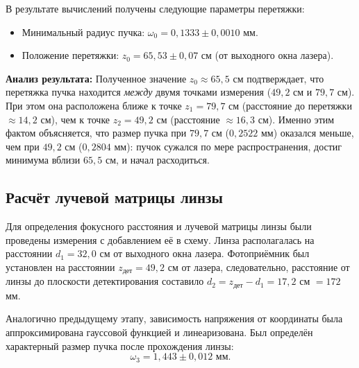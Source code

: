\documentclass[12pt, a4paper]{article}
\begin{document}

В результате вычислений получены следующие параметры перетяжки:
\begin{itemize}
    \item Минимальный радиус пучка: $\omega_0 = 0,1333 \pm 0,0010$ мм.
    \item Положение перетяжки: $z_0 = 65,53 \pm 0,07$ см (от выходного окна лазера).
\end{itemize}

\textbf{Анализ результата:} 
Полученное значение $z_0 \approx 65,5$ см подтверждает, что перетяжка пучка находится \textit{между} двумя точками измерения ($49,2$ см и $79,7$ см). При этом она расположена ближе к точке $z_1 = 79,7$ см (расстояние до перетяжки $\approx 14,2$ см), чем к точке $z_2 = 49,2$ см (расстояние $\approx 16,3$ см). Именно этим фактом объясняется, что размер пучка при $79,7$ см ($0,2522$ мм) оказался меньше, чем при $49,2$ см ($0,2804$ мм): пучок сужался по мере распространения, достиг минимума вблизи $65,5$ см, и начал расходиться.









\subsection*{Расчёт лучевой матрицы линзы}

Для определения фокусного расстояния и лучевой матрицы линзы были проведены измерения с добавлением её в схему. Линза располагалась на расстоянии $d_1 = 32,0$ см от выходного окна лазера. Фотоприёмник был установлен на расстоянии $z_{\text{дет}} = 49,2$ см от лазера, следовательно, расстояние от линзы до плоскости детектирования составило $d_2 = z_{\text{дет}} - d_1 = 17,2$ см $= 172$ мм.

Аналогично предыдущему этапу, зависимость напряжения от координаты была аппроксимирована гауссовой функцией и линеаризована. Был определён характерный размер пучка после прохождения линзы:
\begin{equation}
    \omega_3 = 1,443 \pm 0,012 \text{ мм}.
\end{equation}
\end{document}
